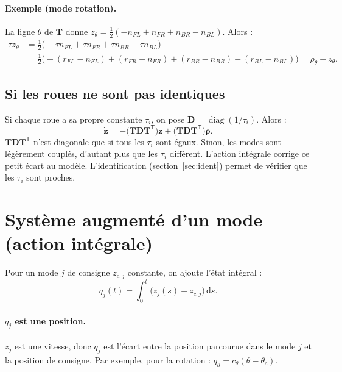 \documentclass[11pt,a4paper]{article}
\newcommand{\vect}[1]{\boldsymbol{#1}}
\newcommand{\T}{\mathsf{T}}
\newcommand{\Tm}{\vect{T}}
\begin{document}
\paragraph{Exemple (mode rotation).}
La ligne $\theta$ de $\Tm$ donne $z_\theta=\tfrac12(-n_{FL}+n_{FR}+n_{BR}-n_{BL})$. Alors :
\[
\begin{aligned}
\tau\dot z_\theta
&=\tfrac12\big(-\tau\dot n_{FL}+\tau\dot n_{FR}+\tau\dot n_{BR}-\tau\dot n_{BL}\big)\\
&=\tfrac12\big(-(r_{FL}-n_{FL})+(r_{FR}-n_{FR})+(r_{BR}-n_{BR})-(r_{BL}-n_{BL})\big)
=\rho_\theta-z_\theta .
\end{aligned}
\]

\subsection{Si les roues ne sont pas identiques}

Si chaque roue a sa propre constante $\tau_i$, on pose $\vect D=\operatorname{diag}(1/\tau_i)$. Alors :
\begin{equation}
\dot{\vect z}=-\big(\Tm\vect D\Tm^\T\big)\vect z+\big(\Tm\vect D\Tm^\T\big)\vect\rho .
\end{equation}
$\Tm\vect D\Tm^\T$ n'est diagonale que si tous les $\tau_i$ sont égaux.
Sinon, les modes sont légèrement couplés, d'autant plus que les $\tau_i$ diffèrent.
L'action intégrale corrige ce petit écart au modèle. L'identification (section~\ref{sec:ident}) permet de vérifier que les $\tau_i$ sont proches.

\section{Système augmenté d'un mode (action intégrale)}\label{sec:aug}

Pour un mode $j$ de consigne $z_{c,j}$ constante, on ajoute l'état intégral :
\begin{equation}
q_j(t)=\int_0^t\big(z_j(s)-z_{c,j}\big)\,\mathrm ds .
\end{equation}

\paragraph{$q_j$ est une position.}
$z_j$ est une vitesse, donc $q_j$ est l'écart entre la position parcourue dans le mode $j$ et la position de consigne.
Par exemple, pour la rotation : $q_\theta=c_\theta(\theta-\theta_c)$.
\end{document}
